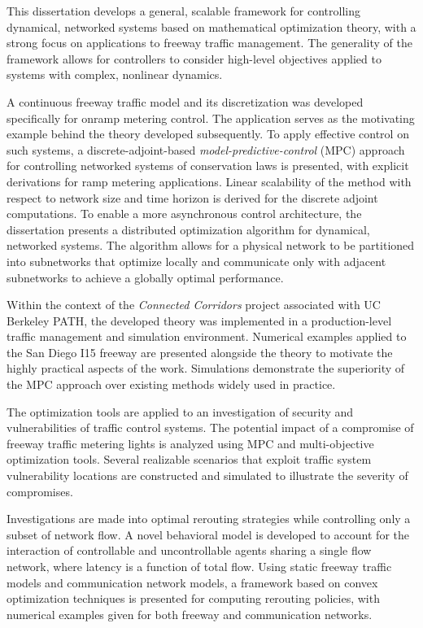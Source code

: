 This dissertation develops a general, scalable framework for controlling dynamical, networked systems based on mathematical optimization theory, with a strong focus on applications to freeway traffic management. The generality of the framework allows for controllers to consider high-level objectives applied to systems with complex, nonlinear dynamics.

A continuous freeway traffic model and its discretization was developed specifically for onramp metering control. The application serves as the motivating example behind the theory developed subsequently. To apply effective control on such systems, a discrete-adjoint-based \emph{model-predictive-control} (MPC) approach for controlling networked systems of conservation laws is presented, with explicit derivations for ramp metering applications. Linear scalability of the method with respect to network size and time horizon is derived for the discrete adjoint computations. To enable a more asynchronous control architecture, the dissertation presents a distributed optimization algorithm for dynamical, networked systems. The algorithm allows for a physical network to be partitioned into subnetworks that optimize locally and communicate only with adjacent subnetworks to achieve a globally optimal performance. 

Within the context of the \emph{Connected Corridors} project associated with UC Berkeley PATH, the developed theory was implemented in a production-level traffic management and simulation environment. Numerical examples applied to the San Diego I15 freeway are presented alongside the theory to motivate the highly practical aspects of the work. Simulations demonstrate the superiority of the MPC approach over existing methods widely used in practice.

The optimization tools are applied to an investigation of security and vulnerabilities of traffic control systems. The potential impact of a compromise of freeway traffic metering lights is analyzed using MPC and multi-objective optimization tools. Several realizable scenarios that exploit traffic system vulnerability locations are constructed and simulated to illustrate the severity of compromises.

Investigations are made into optimal rerouting strategies while controlling only a subset of network flow. A novel behavioral model is developed to account for the interaction of controllable and uncontrollable agents sharing a single flow network, where latency is a function of total flow. Using static freeway traffic models and communication network models, a framework based on convex optimization techniques is presented for computing rerouting policies, with numerical examples given for both freeway and communication networks.